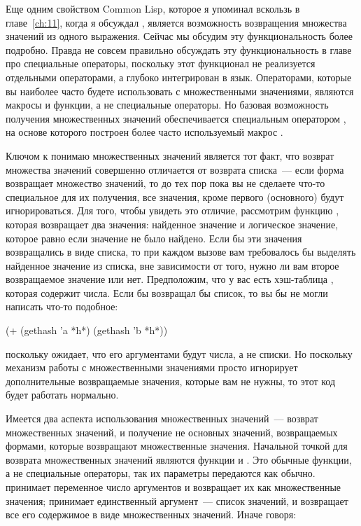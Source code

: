 Еще одним свойством Common Lisp, которое я упоминал вскользь в главе~\ref{ch:11}, когда я
обсуждал , является возможность возвращения множества значений из одного
выражения. Сейчас мы обсудим эту функциональность более подробно. Правда не совсем
правильно обсуждать эту функциональность в главе про специальные операторы, поскольку этот
функционал не реализуется отдельными операторами, а глубоко интегрирован в
язык. Операторами, которые вы наиболее часто будете использовать с множественными
значениями, являются макросы и функции, а не специальные операторы.  Но базовая
возможность получения множественных значений обеспечивается специальным оператором
, на основе которого построен более часто используемый макрос
.

Ключом к понимаю множественных значений является тот факт, что возврат множества значений
совершенно отличается от возврата списка~--- если форма возвращает множество значений, то
до тех пор пока вы не сделаете что-то специальное для их получения, все значения, кроме
первого (основного) будут игнорироваться.  Для того, чтобы увидеть это отличие, рассмотрим
функцию , которая возвращает два значения: найденное значение и логическое
значение, которое равно  если значение не было найдено.  Если бы эти значения
возвращались в виде списка, то при каждом вызове  вам требовалось бы
выделять найденное значение из списка, вне зависимости от того, нужно ли вам второе
возвращаемое значение или нет.  Предположим, что у вас есть хэш-таблица ,
которая содержит числа.  Если бы  возвращал бы список, то вы бы не могли
написать что-то подобное:

\begin{myverb}
(+ (gethash 'a *h*) (gethash 'b *h*))
\end{myverb}

поскольку \code{+} ожидает, что его аргументами будут числа, а не списки. Но поскольку
механизм работы с множественными значениями просто игнорирует дополнительные возвращаемые
значения, которые вам не нужны, то этот код будет работать нормально.

Имеется два аспекта использования множественных значений~--- возврат множественных
значений, и получение не основных значений, возвращаемых формами, которые возвращают
множественные значения.  Начальной точкой для возврата множественных значений являются
функции  и .  Это обычные функции, а не специальные
операторы, так их параметры передаются как обычно.   принимает переменное
число аргументов и возвращает их как множественные значения;  принимает
единственный аргумент~--- список значений, и возвращает все его содержимое в виде
множественных значений.  Иначе говоря:

